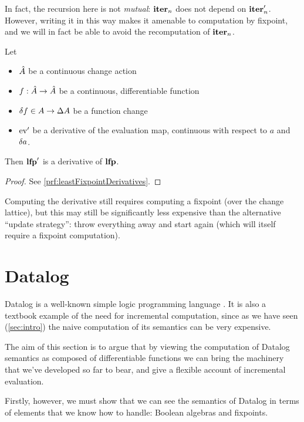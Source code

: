 In fact, the recursion here is not \emph{mutual}: $\mathbf{iter}_n$ does
not depend on $\mathbf{iter}_n'$. However, writing it in this way makes it
amenable to computation by fixpoint, and we will in fact be able to avoid the recomputation of $\mathbf{iter}_n$.

\begin{thm}[name=Derivatives of least fixpoint operators, restate=leastFixpointDerivatives]
  \label{thm:leastFixpointDerivatives}
  Let
  \begin{itemize}
    \item $\hat{A}$ be a continuous change action
    \item $f : \hat{A} \rightarrow \hat{A}$ be a continuous, differentiable function
    \item $\delta f \in A \rightarrow \Delta A$ be a function change
    \item $\operatorname{ev}'$ be a derivative of the evaluation map, continuous with
      respect to $a$ and $\delta a$.
  \end{itemize}
  Then $\mathbf{lfp}'$ is a derivative of $\mathbf{lfp}$.
\end{thm}
\ifproofs
\begin{proof}
  See \cref{prf:leastFixpointDerivatives}.
\end{proof}
\fi

Computing the derivative still requires computing a fixpoint (over the change
lattice), but this may still be significantly less expensive than the
alternative ``update strategy'': throw everything away and start
again (which will itself require a fixpoint computation).

\section{Datalog}
\label{sec:datalog}

Datalog is a well-known simple logic programming language \autocite[See][part D]{abiteboul1995foundations}.
It is also a textbook example of the need for incremental computation, since as we have seen
(\cref{sec:intro}) the naive computation of its semantics can be very expensive.

The aim of this section is to argue that by viewing the computation
of Datalog semantics as composed of differentiable functions we can
bring the machinery that we've developed so far to bear, and give a flexible
account of incremental evaluation. 

Firstly, however, we must show that we can see the semantics of Datalog in terms
of elements that we know how to handle: Boolean algebras and fixpoints.

